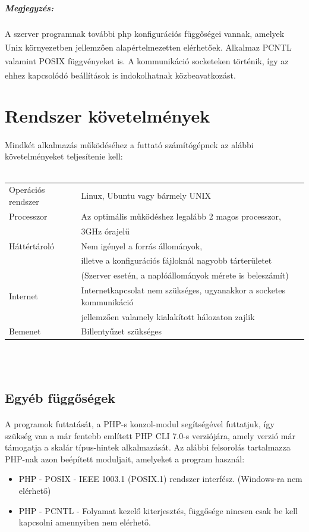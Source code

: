 \documentclass[12pt]{report}
\begin{document}
\subparagraph{Megjegyzés:}
A szerver programnak további php konfigurációs függőségei vannak, amelyek Unix környezetben jellemzően alapértelmezetten elérhetőek. Alkalmaz PCNTL\textsuperscript{\cite{phppcntl}} valamint POSIX \textsuperscript{\cite{phppos}} függvényeket is. A kommunikáció socketeken történik, így az ehhez kapcsolódó beállítások is indokolhatnak közbeavatkozást.\textsuperscript{\cite{phpsock}}

\pagebreak

\section{Rendszer követelmények}
\paragraph{}
	Mindkét alkalmazás működéséhez a futtató számítógépnek az alábbi követelményeket teljesítenie kell: \\ \\
  \begin{tabular}{l | l}
  Operációs rendszer & Linux, Ubuntu vagy bármely UNIX \\
  Processzor & Az optimális működéshez legalább 2 magos processzor, \\
  & 3GHz órajelű \\
  Háttértároló & Nem igényel a forrás állományok, \\
  & illetve a konfigurációs fájloknál nagyobb tárterületet \\
  & (Szerver esetén, a naplóállományok mérete is beleszámít)\\
  Internet & Internetkapcsolat nem szükséges, ugyanakkor a socketes kommunikáció \\
  & jellemzően valamely kialakított hálozaton zajlik\\
  Bemenet & Billentyűzet szükséges 
  \end{tabular} \\ \\
\subsection{Egyéb függőségek}
\paragraph{}
  A programok futtatását, a PHP-s konzol-modul segítségével futtatjuk, így szükség van a már fentebb említett PHP CLI 7.0-s verziójára, amely verzió már támogatja a skalár típus-hintek alkalmazását.
  Az alábbi felsorolás tartalmazza  PHP-nak azon beépített moduljait, amelyeket a program használ:
  \begin{itemize}
  \item PHP - POSIX - IEEE 1003.1 (POSIX.1) rendszer interfész. (Windows-ra nem elérhető)
  \item PHP - PCNTL - Folyamat kezelő kiterjesztés, függősége nincsen csak be kell kapcsolni amennyiben nem elérhető.
  \end{itemize}
  
\end{document}

